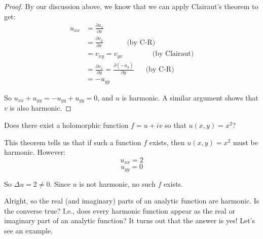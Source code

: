 \begin{proof} By our discussion above, we know that we can apply Clairaut's theorem to get:
\begin{align*}u_{xx} &= \frac{\partial u_x}{\partial x}\\
& = \frac{\partial v_y}{\partial x} \hspace{40pt} \text{(by C-R)}\\
&= v_{xy} = v_{yx} \hspace{50pt} \text{(by Clairaut)}\\
&= \frac{\partial v_x}{\partial y} = \frac{\partial (-u_y)}{\partial y} \hspace{20pt} \text{(by C-R)}\\
&= -u_{yy}
\end{align*}

So $u_{xx} + u_{yy} = -u_{yy} + u_{yy} = 0$, and $u$ is harmonic. A similar argument shows that $v$ is also harmonic.
\end{proof}

\begin{ex}{}{} Does there exist a holomorphic function $f = u + iv$ so that $u(x,y) = x^2$?

This theorem tells us that if such a function $f$ exists, then $u(x,y) = x^2$ must be harmonic. However:
$$u_{xx} = 2$$
$$u_{yy} = 0$$

So $\Delta u = 2 \ne 0$. Since $u$ is not harmonic, no such $f$ exists.
\end{ex}

Alright, so the real (and imaginary) parts of an analytic function are harmonic. Is the converse true? I.e., does every harmonic function appear as the real or imaginary part of an analytic function? It turns out that the answer is yes! Let's see an example.


